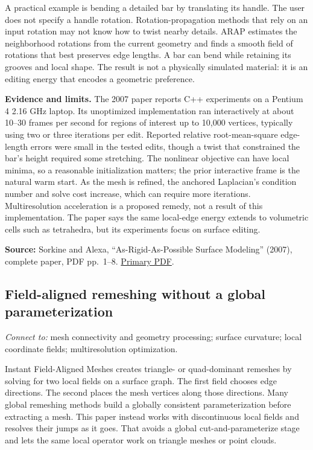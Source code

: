 A practical example is bending a detailed bar by translating its handle. The user does not specify a handle rotation. Rotation-propagation methods that rely on an input rotation may not know how to twist nearby details. ARAP estimates the neighborhood rotations from the current geometry and finds a smooth field of rotations that best preserves edge lengths. A bar can bend while retaining its grooves and local shape. The result is not a physically simulated material: it is an editing energy that encodes a geometric preference.

\textbf{Evidence and limits.} The 2007 paper reports C++ experiments on a Pentium 4 2.16 GHz laptop. Its unoptimized implementation ran interactively at about 10--30 frames per second for regions of interest up to 10,000 vertices, typically using two or three iterations per edit. Reported relative root-mean-square edge-length errors were small in the tested edits, though a twist that constrained the bar's height required some stretching. The nonlinear objective can have local minima, so a reasonable initialization matters; the prior interactive frame is the natural warm start. As the mesh is refined, the anchored Laplacian's condition number and solve cost increase, which can require more iterations. Multiresolution acceleration is a proposed remedy, not a result of this implementation. The paper says the same local-edge energy extends to volumetric cells such as tetrahedra, but its experiments focus on surface editing.

\textbf{Source:} Sorkine and Alexa, ``As-Rigid-As-Possible Surface Modeling'' (2007), complete paper, PDF pp.~1--8. \href{https://igl.ethz.ch/projects/ARAP/arap_web.pdf}{Primary PDF}.

\subsection{Field-aligned remeshing without a global parameterization}\label{03-visual-computing-i-ch002-field-aligned-remeshing-without-a-global-parameterization}

\emph{Connect to:} mesh connectivity and geometry processing; surface curvature; local coordinate fields; multiresolution optimization.

Instant Field-Aligned Meshes creates triangle- or quad-dominant remeshes by solving for two local fields on a surface graph. The first field chooses edge directions. The second places the mesh vertices along those directions. Many global remeshing methods build a globally consistent parameterization before extracting a mesh. This paper instead works with discontinuous local fields and resolves their jumps as it goes. That avoids a global cut-and-parameterize stage and lets the same local operator work on triangle meshes or point clouds.

